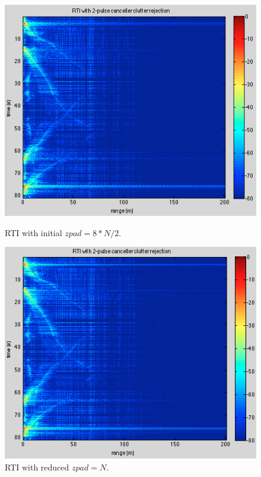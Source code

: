 \documentclass{article}
\begin{document}
\begin{figure}[ht]
\begin{minipage}[b]{0.5\linewidth}
\centering
\includegraphics[width=\textwidth]{Figures/zpad_range_normal.png}
\caption{RTI with initial $zpad = 8*N/2$.}
\label{fig:zpad_range_normal}
\end{minipage}
\begin{minipage}[b]{0.5\linewidth}
\centering
\includegraphics[width=\textwidth]{Figures/zpad_range_reduced.png}
\caption{RTI with reduced $zpad = N$.}
\label{fig:zpad_range_reduced}
\end{minipage}
\end{figure}
\end{document}
